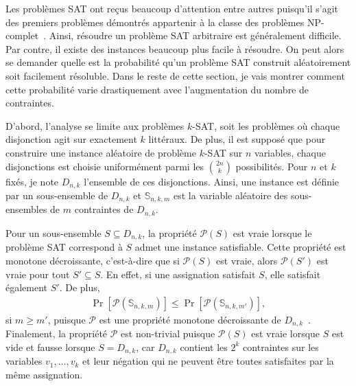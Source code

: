 Les problèmes SAT ont reçus beaucoup d'attention entre autres
puisqu'il s'agit des premiers problèmes démontrés appartenir à la classe 
des problèmes NP-complet~\cite{cook_complexity_1971}.
Ainsi,
résoudre un problème SAT arbitraire est généralement difficile.
Par contre,
il existe des instances beaucoup plus facile à résoudre.
On peut alors se demander quelle est la probabilité qu'un problème SAT
construit aléatoirement soit facilement résoluble.
Dans le reste de cette section,
je vais montrer comment cette probabilité varie drastiquement avec 
l'augmentation du nombre de contraintes.

D'abord,
l'analyse se limite aux problèmes $k$-SAT,
soit les problèmes où chaque disjonction agit sur exactement $k$ littéraux.
De plus,
il est supposé que pour construire une instance aléatoire de problème $k$-SAT sur $n$ variables,
chaque disjonctions est choisie uniformément parmi les $\binom{2n}{k}$ possibilités.
Pour $n$ et $k$ fixés, je note $D_{n,k}$ l'ensemble de ces disjonctions.
Ainsi, une instance est définie par un sous-ensemble de $D_{n, k}$ et $\mathbb S_{n,k,m}$ 
est la variable aléatoire des sous-ensembles de $m$ contraintes de $D_{n, k}$.

Pour un sous-ensemble $S \subseteq D_{n, k}$,
la propriété $\mathcal P(S)$ est vraie lorsque le problème SAT correspond à $S$
admet une instance satisfiable.
Cette propriété est monotone décroissante,
c'est-à-dire que si $\mathcal P(S)$ est vraie,
alors $\mathcal P(S')$ est vraie pour tout $S' \subseteq S$.
En effet,
si une assignation satisfait $S$, elle satisfait également $S'$.
De plus,
\begin{align}
  \Pr[\mathcal P(\mathbb S_{n, k, m})] \leq 
  \Pr[\mathcal P(\mathbb S_{n, k, m'})],
\end{align}
si $m \geq m'$,
puisque $\mathcal P$ est une propriété monotone décroissante 
de $D_{n, k}$~\cite{bollobas_threshold_1987}.
Finalement, la propriété $\mathcal P$ est non-trivial puisque
$\mathcal P(S)$ est vraie lorsque $S$ est vide et fausse lorsque $S = D_{n, k}$,
car $D_{n, k}$ contient les $2^k$ contraintes
sur les variables $v_1, \ldots, v_k$ et leur négation
qui ne peuvent être toutes satisfaites par la même assignation.

